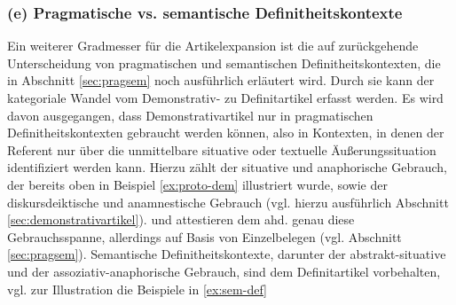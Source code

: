 \subsubsection{(e) Pragmatische vs. semantische Definitheitskontexte} 
Ein weiterer Gradmesser für die Artikelexpansion ist die auf \textcite{Lobner1985,Lobner1998} zurückgehende Unterscheidung von pragmatischen und semantischen Definitheitskontexten, die in Abschnitt \ref{sec:pragsem} noch ausführlich erläutert wird. Durch sie kann der kategoriale Wandel vom Demonstrativ- zu Definitartikel erfasst werden. Es wird davon ausgegangen, dass Demonstrativartikel nur in pragmatischen Definitheitskontexten gebraucht werden können, also in Kontexten, in denen der Referent nur über die unmittelbare situative oder textuelle Äußerungssituation identifiziert werden kann. Hierzu zählt der situative und anaphorische Gebrauch, der bereits oben in Beispiel \ref{ex:proto-dem} illustriert wurde, sowie der diskursdeiktische und anamnestische Gebrauch (vgl. hierzu ausführlich Abschnitt \ref{sec:demonstrativartikel}). \textcite[84-88]{Philippi1997} und \textcite[112-117]{Demske2001} attestieren dem ahd.  genau diese Gebrauchsspanne, allerdings auf Basis von Einzelbelegen (vgl. Abschnitt \ref{sec:pragsem}). Semantische Definitheitskontexte, darunter der abstrakt-situative und der assoziativ-anaphorische Gebrauch, sind dem Definitartikel vorbehalten, vgl. zur Illustration die Beispiele in \ref{ex:sem-def}

